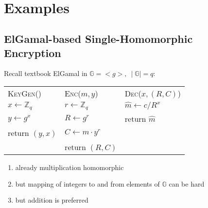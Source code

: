 \documentclass{report}
\begin{document}
\section{Examples}
\begin{adjustwidth}{2em}{2em}
	\subsection{ElGamal-based Single-Homomorphic Encryption}
	\begin{adjustwidth}{2em}{}
		Recall textbook ElGamal in $\mathbb{G} = <g>, \ \mid \mathbb{G} \mid = q$: \\
		\begin{tabular}{lll}
			\textsc{KeyGen}() & \textsc{Enc}($m,y$) & \textsc{Dec}($x,(R,C)$) \\
			\indent $x \leftarrow \mathbb{Z}_q$ & \indent $r \leftarrow \mathbb{Z}_q$ & \indent $\hat{m} \leftarrow c / R^x$ \\
			\indent $y \leftarrow g^x$ & \indent $R \leftarrow g^r$ & \indent return $\hat{m}$ \\
			\indent return $(y,x)$ & \indent $C \leftarrow m \cdot y^r$ \\
			& \indent return $(R,C)$
		\end{tabular}
		\begin{enumerate}[-]
			\item already multiplication homomorphic
			\item but mapping of integers to and from elements of $\mathbb{G}$ can be hard
			\item but addition is preferred
		\end{enumerate}
	\end{adjustwidth}

\end{adjustwidth}
\end{document}
